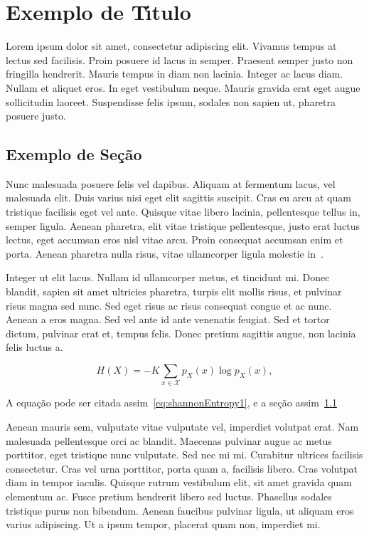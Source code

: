 \chapter{Exemplo de T\'{\i}tulo}
\label{cap:cap01}

Lorem ipsum dolor sit amet, consectetur adipiscing elit. Vivamus tempus at lectus sed facilisis. Proin posuere id lacus in semper. Praesent semper justo non fringilla hendrerit. Mauris tempus in diam non lacinia. Integer ac lacus diam. Nullam et aliquet eros. In eget vestibulum neque. Mauris gravida erat eget augue sollicitudin laoreet. Suspendisse felis ipsum, sodales non sapien ut, pharetra posuere justo.

\section{Exemplo de Se\c{c}\~{a}o}
\label{sec:sec01}

Nunc malesuada posuere felis vel dapibus. Aliquam at fermentum lacus, vel malesuada elit. Duis varius nisi eget elit sagittis suscipit. Cras eu arcu at quam tristique facilisis eget vel ante. Quisque vitae libero lacinia, pellentesque tellus in, semper ligula. Aenean pharetra, elit vitae tristique pellentesque, justo erat luctus lectus, eget accumsan eros nisl vitae arcu. Proin consequat accumsan enim et porta. Aenean pharetra nulla risus, vitae ullamcorper ligula molestie in~\cite{Cover2006}.

Integer ut elit lacus. Nullam id ullamcorper metus, et tincidunt mi. Donec blandit, sapien sit amet ultricies pharetra, turpis elit mollis risus, et pulvinar risus magna sed nunc. Sed eget risus ac risus consequat congue et ac nunc. Aenean a eros magna. Sed vel ante id ante venenatis feugiat. Sed et tortor dictum, pulvinar erat et, tempus felis. Donec pretium sagittis augue, non lacinia felis luctus a.

\begin{equation}
H(X) =-K\sum_{x\in\mathcal{X}} p_X(x)\log p_X(x),
\label{eq:shannonEntropy1}
\end{equation}

A equa\c{c}\~{a}o pode ser citada assim~\eqref{eq:shannonEntropy1}, e a se\c{c}\~{a}o assim~\ref{sec:sec01}

Aenean mauris sem, vulputate vitae vulputate vel, imperdiet volutpat erat. Nam malesuada pellentesque orci ac blandit. Maecenas pulvinar augue ac metus porttitor, eget tristique nunc vulputate. Sed nec mi mi. Curabitur ultrices facilisis consectetur. Cras vel urna porttitor, porta quam a, facilisis libero. Cras volutpat diam in tempor iaculis. Quisque rutrum vestibulum elit, sit amet gravida quam elementum ac. Fusce pretium hendrerit libero sed luctus. Phasellus sodales tristique purus non bibendum. Aenean faucibus pulvinar ligula, ut aliquam eros varius adipiscing. Ut a ipsum tempor, placerat quam non, imperdiet mi.

